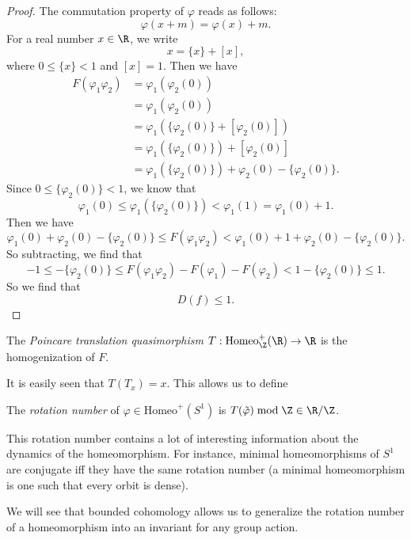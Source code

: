 \documentclass[a4paper]{article}
\newcommand\Homeo{\mathrm{Homeo}}
\begin{document}
\begin{proof}
  The commutation property of $\varphi$ reads as follows:
  \[
    \varphi(x + m) = \varphi(x) + m.
  \]
  For a real number $x \in \R$, we write
  \[
    x = \{x \} + [x],
  \]
  where $0 \leq \{x\} < 1$ and $[x] = 1$. Then we have
  \begin{align*}
    F(\varphi_1 \varphi_2) &= \varphi_1(\varphi_2(0)) \\
    &= \varphi_1(\varphi_2(0))\\
    &= \varphi_1(\{\varphi_2(0)\} + [\varphi_2(0)])\\
    &= \varphi_1(\{\varphi_2(0)\}) + [\varphi_2(0)]\\
    &= \varphi_1(\{\varphi_2(0)\}) + \varphi_2(0) - \{\varphi_2(0)\}.
  \end{align*}
  Since $0 \leq \{\varphi_2(0)\} < 1$, we know that
  \[
    \varphi_1(0) \leq \varphi_1(\{\varphi_2(0)\}) < \varphi_1(1) = \varphi_1(0) + 1.
  \]
  Then we have
  \[
    \varphi_1(0) + \varphi_2(0) - \{\varphi_2(0)\} \leq F(\varphi_1\varphi_2) < \varphi_1(0) + 1 + \varphi_2(0) - \{\varphi_2(0)\}.
  \]
  So subtracting, we find that
  \[
    -1 \leq - \{\varphi_2(0)\} \leq F(\varphi_1 \varphi_2) - F(\varphi_1) - F(\varphi_2) < 1 - \{\varphi_2(0) \} \leq 1.
  \]
  So we find that
  \[
    D(f) \leq 1.
  \]
\end{proof}

\begin{defi}
  The \emph{Poincare translation quasimorphism} $T: \Homeo_\Z^+ (\R) \to \R$ is the homogenization of $F$.
\end{defi}

It is easily seen that $T(T_x) = x$. This allows us to define

\begin{defi}
  The \emph{rotation number}  of $\varphi \in \Homeo^+(S^1)$ is $T(\tilde{\varphi}) \bmod \Z \in \R/\Z$.
\end{defi}
This rotation number contains a lot of interesting information about the dynamics of the homeomorphism. For instance, minimal homeomorphisms of $S^1$ are conjugate iff they have the same rotation number (a minimal homeomorphism is one such that every orbit is dense).

We will see that bounded cohomology allows us to generalize the rotation number of a homeomorphism into an invariant for any group action.
\end{document}
